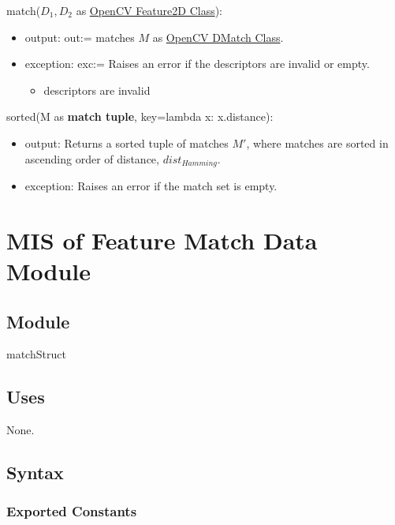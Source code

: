 \documentclass[12pt, titlepage]{article}
\begin{document}
\noindent match($D_1, D_2$ as \href{https://docs.opencv.org/4.x/d0/d13/classcv_1_1Feature2D.html}{OpenCV Feature2D Class}):
\begin{itemize}
\item output: out:= matches $M$ as \href{https://docs.opencv.org/3.4/d4/de0/classcv_1_1DMatch.html}{OpenCV DMatch Class}.
\item exception: exc:= Raises an error if the descriptors are invalid or empty.
  \begin{itemize}
      \item descriptors are invalid
  \end{itemize}
\end{itemize}

\noindent sorted(M as \textbf{match tuple}, key=lambda x: x.distance): 
\begin{itemize} 
  \item output: Returns a sorted tuple of matches $M'$, where matches are sorted in 
  ascending order of distance, $dist_{Hamming}$. 
  \item exception: Raises an error if the match set is empty. 
\end{itemize}



\section{MIS of Feature Match Data Module} \label{mFMD}


\subsection{Module}

matchStruct

\subsection{Uses}
None.

\subsection{Syntax}

\subsubsection{Exported Constants}
\end{document}
